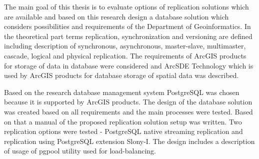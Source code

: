 The main goal of this thesis is to evaluate options of replication
solutions which are available and based on this research design a database solution which
considers possibilities and requirements of the Department of
Geoinformatics. In the theoretical part terms replication,
synchronization and versioning are defined including description of
synchronous, asynchronous, master-slave, multimaster, cascade, logical and
physical replication. The requirements of ArcGIS products for storage of data
in database were considered and ArcSDE Technology which is used by ArcGIS products
for database storage of spatial data was described. 

Based on the research database management system PostgreSQL was chosen because
it is supported by ArcGIS products. The design of the database solution was
created based on all requirements and the main processes were tested. Based on
that a manual of the proposed replication solution setup was written. Two 
replication options were tested - PostgreSQL native streaming replication
and replication using PostgreSQL extension Slony-I. The design includes a description of usage of pgpool utility used for
load-balancing. 





